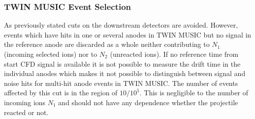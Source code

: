 \subsubsection{TWIN MUSIC Event Selection}
As previously stated cuts on the downstream detectors are avoided. However, events which have hits in one or several anodes in TWIN MUSIC but no signal in the reference anode are discarded as a whole neither contributing to $N_1$ (incoming selected ions) nor to $N_2$ (unreacted ions). If no reference time from start CFD signal is available it is not possible to measure the drift time in the individual anodes which makes it not possible to distinguish between signal and noise hits for multi-hit anode events in TWIN MUSIC. The number of events affected by this cut is in the region of $10/10^5$. This is negligible to the number of incoming ions $N_1$ and should not have any dependence whether the projectile reacted or not.
